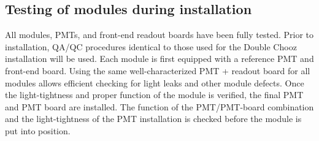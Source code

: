 \subsection{Testing of modules during installation}

All modules, PMTs, and front-end readout boards have been fully tested. Prior to installation, QA/QC procedures identical to those used for the Double Chooz installation will be used. Each module is first equipped with a reference PMT and front-end board. Using the same well-characterized PMT + readout board for all modules allows efficient checking for light leaks and other module defects. Once the light-tightness and proper function of the module is verified, the final PMT and PMT board are installed. The function of the PMT/PMT-board combination and the light-tightness of the PMT installation is checked before the module is put into position.
